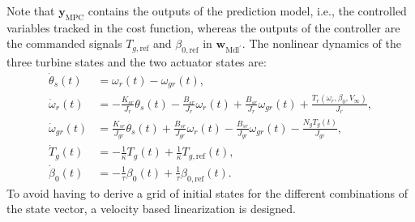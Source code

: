 %
Note that $\bm{y}_{\text{MPC}}$ contains the outputs of the prediction model, i.e., the controlled variables tracked in the cost function, whereas the outputs of the controller are the commanded signals $T_{g,\text{ref}}$ and $\beta_{0,\text{ref}}$ in $\bm{w}_{\text{Mdl}^\prime}$. The nonlinear dynamics of the three turbine states and the two actuator states are:
\begin{align}
    \dot{\theta}_s(t) &= \omega_r(t)-\omega_{gr}(t) \label{eq:NLDyn1},\\
    \dot{\omega}_r(t) &= -\frac{K_{sr}}{J_r}\theta_s(t)-\frac{B_{sr}}{J_r}\omega_r(t)+\frac{B_{sr}}{J_r}\omega_{gr}(t)+\frac{T_r(\omega_r, \beta_0, V_\infty)}{J_r},\\
    \dot{\omega}_{gr}(t) &= \frac{K_{sr}}{J_{gr}}\theta_s(t)+\frac{B_{sr}}{J_{gr}}\omega_r(t)-\frac{B_{sr}}{J_{gr}}\omega_{gr}(t)-\frac{N_g T_g(t)}{J_{gr}} \label{eq:NLDyn3},\\
    \dot{T}_{g}(t) &= -\frac{1}{\kappa}T_{g}(t)+\frac{1}{\kappa}T_{g,\text{ref}}(t),\\
    \dot{\beta}_0(t) &= -\frac{1}{\tau}\beta_0(t)+\frac{1}{\tau}\beta_{0,\text{ref}}(t).\label{eq:NLDyn5}
\end{align}
%
To avoid having to derive a grid of initial states for the different combinations of the state vector, a velocity based linearization is designed.

